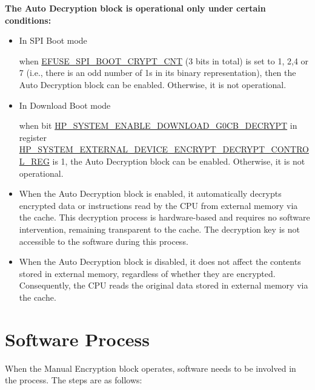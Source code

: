 \documentclass[main\_\_EN.tex]{subfiles}
\begin{document}
\textbf{The Auto Decryption block is operational only under certain conditions:}

\begin{itemize}

    \item In SPI Boot mode

    when \hyperref[fielddesc:EFUSESPIBOOTCRYPTCNT]{EFUSE\_SPI\_BOOT\_CRYPT\_CNT} (3 bits in total) is set to 1, 2,4 or 7 (i.e., there is an odd number of 1s in its binary representation), then the Auto Decryption block can be enabled. Otherwise, it is not operational.

    \item In Download Boot mode

    when bit \hyperref[fielddesc:HPSYSTEMENABLEDOWNLOADG0CBDECRYPT]{HP\_SYSTEM\_ENABLE\_DOWNLOAD\_G0CB\_DECRYPT} in register\\ \hyperref[regdesc:HPSYSTEMEXTERNALDEVICEENCRYPTDECRYPTCONTROLREG]{HP\_SYSTEM\_EXTERNAL\_DEVICE\_ENCRYPT\_DECRYPT\_CONTROL\_REG} is 1, the Auto Decryption block can be enabled. Otherwise, it is not operational.

\end{itemize}

\begin{tiplisting}
\vspace{-2em}
\begin{itemize}

\item When the Auto Decryption block is enabled, it automatically decrypts encrypted data or instructions read by the CPU from external memory via the cache. This decryption process is hardware-based and requires no software intervention, remaining transparent to the cache. The decryption key is not accessible to the software during this process.

\item When the Auto Decryption block is disabled, it does not affect the contents stored in external memory, regardless of whether they are encrypted. Consequently, the CPU reads the original data stored in external memory via the cache.
\end{itemize}
\end{tiplisting}


\section{ Software Process }

When the Manual Encryption block operates, software needs to be involved in the process. The steps are as follows:
\end{document}

